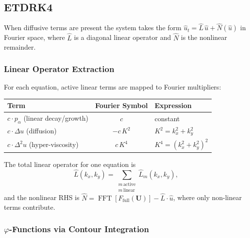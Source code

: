 \documentclass[11pt, letterpaper]{article}
\theoremstyle{definition}
\newcommand{\lap}{\Delta}
\newcommand{\bilap}{\Delta^{2}}
\DeclareMathOperator{\fftn}{FFT}
\begin{document}
\subsection{ETDRK4}
\label{sec:etdrk4}

When diffusive terms are present the system takes the form
$\hat{u}_t = \hat{L}\,\hat{u} + \hat{N}(\hat{u})$ in Fourier space,
where $\hat{L}$ is a diagonal linear operator and $\hat{N}$ is the
nonlinear remainder.

\subsubsection{Linear Operator Extraction}
\label{sec:linear-extract}

For each equation, active linear terms are mapped to Fourier
multipliers:
\begin{center}
\renewcommand{\arraystretch}{1.2}
\begin{tabular}{lcl}
  \toprule
  \textbf{Term} & \textbf{Fourier Symbol} & \textbf{Expression} \\
  \midrule
  $c \cdot p_\alpha$ (linear decay/growth) & $c$        & constant \\
  $c \cdot \lap u$   (diffusion)           & $-c\,K^{2}$ & $K^{2} = k_x^{2} + k_y^{2}$ \\
  $c \cdot \bilap u$ (hyper-viscosity)     & $c\,K^{4}$  & $K^{4} = (k_x^{2} + k_y^{2})^{2}$ \\
  \bottomrule
\end{tabular}
\end{center}
The total linear operator for one equation is
\begin{equation}
\label{eq:L-hat}
  \hat{L}(k_x, k_y) = \sum_{\substack{m\,\text{active} \\ m\,\text{linear}}} \hat{L}_m(k_x, k_y),
\end{equation}
and the nonlinear RHS is
$\hat{N} = \fftn[F_{\text{full}}(\mathbf{U})] -
\hat{L} \cdot \hat{u}$, where only non-linear terms contribute.

\subsubsection{$\varphi$-Functions via Contour Integration}
\label{sec:phi-functions}
\end{document}
